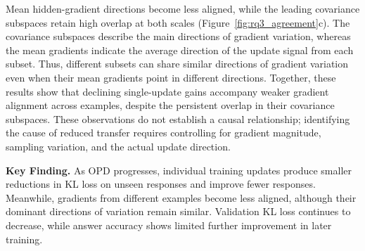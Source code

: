 Mean hidden-gradient directions become less aligned,
while the leading covariance subspaces retain high
overlap at both scales
(Figure~\ref{fig:rq3_agreement}c).
The covariance subspaces describe the main directions
of gradient variation, whereas the mean gradients
indicate the average direction of the update signal
from each subset.
Thus, different subsets can share similar directions
of gradient variation even when their mean gradients
point in different directions.
Together, these results show that declining
single-update gains accompany weaker gradient
alignment across examples, despite the persistent
overlap in their covariance subspaces.
These observations do not establish a causal
relationship; identifying the cause of reduced
transfer requires controlling for gradient magnitude,
sampling variation, and the actual update direction.

\FloatBarrier
\begin{tcolorbox}[
 enhanced, breakable,
 colback=findingbg, colframe=findingblue,
 boxrule=0.7pt, arc=1.5mm,
 left=7pt, right=7pt, top=6pt, bottom=6pt,
 before skip=8pt, after skip=8pt
]
\textbf{\textcolor{findingblue}{Key Finding.}}
As OPD progresses, individual training updates
produce smaller reductions in KL loss on unseen
responses and improve fewer responses.
Meanwhile, gradients from different examples
become less aligned, although their dominant
directions of variation remain similar.
Validation KL loss continues to decrease,
while answer accuracy shows limited further
improvement in later training.
\end{tcolorbox}
